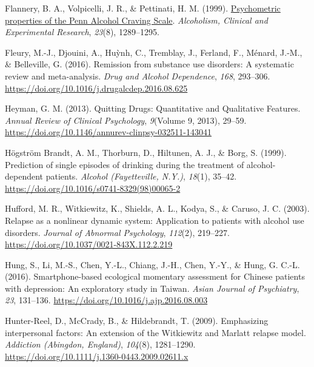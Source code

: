 \documentclass[
  letterpaper,
  DIV=11,
  numbers=noendperiod]{scrartcl}
\newlength{\cslhangindent}
\newenvironment{CSLReferences}[2] %
 {\begin{list}{}{%
  \setlength{\itemindent}{0pt}
  \setlength{\leftmargin}{0pt}
  \setlength{\parsep}{0pt}
  \ifodd #1
   \setlength{\leftmargin}{\cslhangindent}
   \setlength{\itemindent}{-1\cslhangindent}
  \fi
  \setlength{\itemsep}{#2\baselineskip}}}
 {\end{list}}
\begin{document}
\begin{CSLReferences}{1}{0}
Flannery, B. A., Volpicelli, J. R., \& Pettinati, H. M. (1999).
\href{https://www.ncbi.nlm.nih.gov/pubmed/10470970}{Psychometric
properties of the {Penn Alcohol Craving Scale}}. \emph{Alcoholism,
Clinical and Experimental Research}, \emph{23}(8), 1289--1295.

Fleury, M.-J., Djouini, A., Huỳnh, C., Tremblay, J., Ferland, F.,
Ménard, J.-M., \& Belleville, G. (2016). Remission from substance use
disorders: {A} systematic review and meta-analysis. \emph{Drug and
Alcohol Dependence}, \emph{168}, 293--306.
\url{https://doi.org/10.1016/j.drugalcdep.2016.08.625}

Heyman, G. M. (2013). Quitting {Drugs}: {Quantitative} and {Qualitative
Features}. \emph{Annual Review of Clinical Psychology}, \emph{9}(Volume
9, 2013), 29--59.
\url{https://doi.org/10.1146/annurev-clinpsy-032511-143041}

Högström Brandt, A. M., Thorburn, D., Hiltunen, A. J., \& Borg, S.
(1999). Prediction of single episodes of drinking during the treatment
of alcohol-dependent patients. \emph{Alcohol (Fayetteville, N.Y.)},
\emph{18}(1), 35--42.
\url{https://doi.org/10.1016/s0741-8329(98)00065-2}

Hufford, M. R., Witkiewitz, K., Shields, A. L., Kodya, S., \& Caruso, J.
C. (2003). Relapse as a nonlinear dynamic system: {Application} to
patients with alcohol use disorders. \emph{Journal of Abnormal
Psychology}, \emph{112}(2), 219--227.
\url{https://doi.org/10.1037/0021-843X.112.2.219}

Hung, S., Li, M.-S., Chen, Y.-L., Chiang, J.-H., Chen, Y.-Y., \& Hung,
G. C.-L. (2016). Smartphone-based ecological momentary assessment for
{Chinese} patients with depression: {An} exploratory study in {Taiwan}.
\emph{Asian Journal of Psychiatry}, \emph{23}, 131--136.
\url{https://doi.org/10.1016/j.ajp.2016.08.003}

Hunter-Reel, D., McCrady, B., \& Hildebrandt, T. (2009). Emphasizing
interpersonal factors: {An} extension of the {Witkiewitz} and {Marlatt}
relapse model. \emph{Addiction (Abingdon, England)}, \emph{104}(8),
1281--1290. \url{https://doi.org/10.1111/j.1360-0443.2009.02611.x}


\end{CSLReferences}
\end{document}
